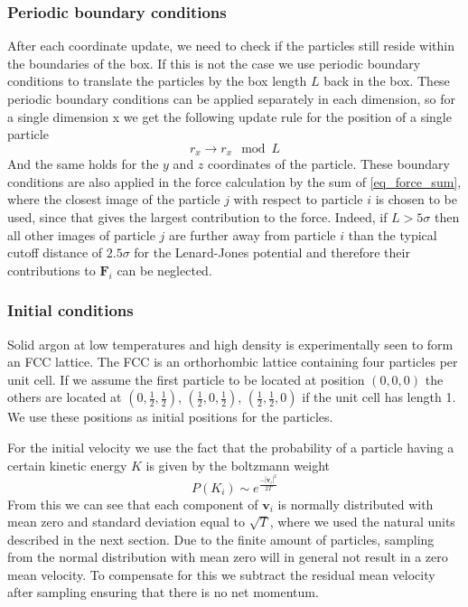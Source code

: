 \documentclass[twoside]{article}
\begin{document}
\subsubsection*{Periodic boundary conditions}
After each coordinate update, we need to check if the particles still reside within the boundaries of the box. If this is not the case we use periodic boundary conditions to translate the particles by the box length $L$ back in the box. These periodic boundary conditions can be applied separately in each dimension, so for a single dimension x we get the following update rule for the position of a single particle
\begin{equation}\label{eq_pbc}
r_x \rightarrow r_x \mod{L}
\end{equation}
And the same holds for the $y$ and $z$ coordinates of the particle. These boundary conditions are also applied in the force calculation by the sum of \eqref{eq_force_sum}, where the closest image of the particle $j$ with respect to particle $i$ is chosen to be used, since that gives the largest contribution to the force. Indeed, if $L > 5\sigma$ then all other images of particle $j$ are further away from particle $i$ than the typical cutoff distance of $2.5\sigma$ for the Lenard-Jones potential and therefore their contributions to $\mathbf{F}_i$ can be neglected.


\subsubsection*{Initial conditions}
Solid argon at low temperatures and high density is experimentally seen to form an FCC lattice. The FCC is an orthorhombic lattice containing four particles per unit cell. If we assume the first particle to be located at position $(0,0,0)$ the others are located at $(0,\frac{1}{2},\frac{1}{2})$, $(\frac{1}{2},0,\frac{1}{2})$, $(\frac{1}{2},\frac{1}{2},0)$ if the unit cell has length 1. We use these positions as initial positions for the particles.

For the initial velocity we use the fact that the probability of a particle having a certain kinetic energy $K$ is given by the boltzmann weight 
\begin{equation}\label{eq_boltzmann}
P(K_i) \sim e^{\frac{-|\mathbf{v}_i|^2}{2T}}
\end{equation}
From this we can see that each component of $\mathbf{v}_i$ is normally distributed with mean zero and standard deviation equal to $\sqrt{T}$, where we used the natural units described in the next section. Due to the finite amount of particles, sampling from the normal distribution with mean zero will in general not result in a zero mean velocity. To compensate for this we subtract the residual mean velocity after sampling ensuring that there is no net momentum.  
\end{document}
